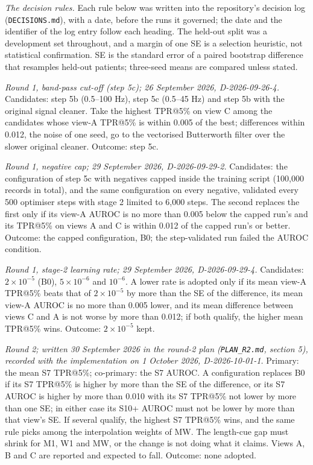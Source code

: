 \documentclass{iopjournal}
\makeatletter
\newcommand{\tpr}{TPR@5\%}
\makeatother
\begin{document}
\textit{The decision rules.} Each rule below was written into the repository's decision log (\texttt{DECISIONS.md}), with a date, before the runs it governed; the date and the identifier of the log entry follow each heading. The held-out split was a development set throughout, and a margin of one SE is a selection heuristic, not statistical confirmation. SE is the standard error of a paired bootstrap difference that resamples held-out patients; three-seed means are compared unless stated.

\textit{Round 1, band-pass cut-off (step 5c); 26 September 2026, D-2026-09-26-4.} Candidates: step 5b (0.5--100 Hz), step 5c (0.5--45 Hz) and step 5b with the original signal cleaner. Take the highest \tpr{} on view C among the candidates whose view-A \tpr{} is within 0.005 of the best; differences within 0.012, the noise of one seed, go to the vectorised Butterworth filter over the slower original cleaner. Outcome: step 5c.

\textit{Round 1, negative cap; 29 September 2026, D-2026-09-29-2.} Candidates: the configuration of step 5c with negatives capped inside the training script (100,000 records in total), and the same configuration on every negative, validated every 500 optimiser steps with stage 2 limited to 6,000 steps. The second replaces the first only if its view-A AUROC is no more than 0.005 below the capped run's and its \tpr{} on views A and C is within 0.012 of the capped run's or better. Outcome: the capped configuration, B0; the step-validated run failed the AUROC condition.

\textit{Round 1, stage-2 learning rate; 29 September 2026, D-2026-09-29-4.} Candidates: $2\times10^{-5}$ (B0), $5\times10^{-6}$ and $10^{-6}$. A lower rate is adopted only if its mean view-A \tpr{} beats that of $2\times10^{-5}$ by more than the SE of the difference, its mean view-A AUROC is no more than 0.005 lower, and its mean difference between views C and A is not worse by more than 0.012; if both qualify, the higher mean \tpr{} wins. Outcome: $2\times10^{-5}$ kept.

\textit{Round 2; written 30 September 2026 in the round-2 plan (\texttt{PLAN\_R2.md}, section 5), recorded with the implementation on 1 October 2026, D-2026-10-01-1.} Primary: the mean S7 \tpr; co-primary: the S7 AUROC. A configuration replaces B0 if its S7 \tpr{} is higher by more than the SE of the difference, or its S7 AUROC is higher by more than 0.010 with its S7 \tpr{} not lower by more than one SE; in either case its S10+ AUROC must not be lower by more than that view's SE. If several qualify, the highest S7 \tpr{} wins, and the same rule picks among the interpolation weights of MW. The length-cue gap must shrink for M1, W1 and MW, or the change is not doing what it claims. Views A, B and C are reported and expected to fall. Outcome: none adopted.
\end{document}
